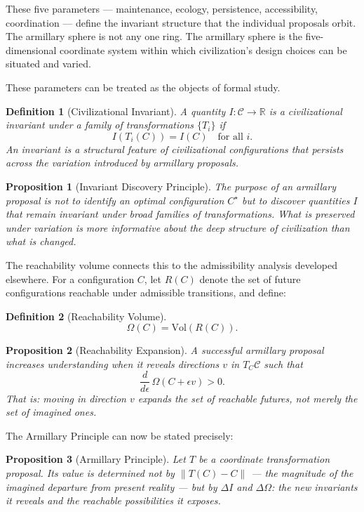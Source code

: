 \documentclass[12pt, a4paper]{article}
\theoremstyle{named}
\newtheorem{proposition}{Proposition}
\newtheorem{definition}{Definition}
\begin{document}
\medskip

These five parameters — maintenance, ecology, persistence,
accessibility, coordination — define the invariant structure that the
individual proposals orbit. The armillary sphere is not any one ring.
The armillary sphere is the five-dimensional coordinate system within
which civilization's design choices can be situated and varied.

These parameters can be treated as the objects of formal study.

\begin{definition}[Civilizational Invariant]
A quantity $I: \mathcal{C} \to \mathbb{R}$ is a \emph{civilizational
invariant} under a family of transformations $\{T_i\}$ if
\[
  I(T_i(C)) = I(C) \quad \text{for all } i.
\]
An invariant is a structural feature of civilizational configurations
that persists across the variation introduced by armillary proposals.
\end{definition}

\begin{proposition}[Invariant Discovery Principle]
The purpose of an armillary proposal is not to identify an optimal
configuration $C^\star$ but to discover quantities $I$ that remain
invariant under broad families of transformations. What is preserved
under variation is more informative about the deep structure of
civilization than what is changed.
\end{proposition}

The reachability volume connects this to the admissibility analysis
developed elsewhere. For a configuration $C$, let $R(C)$ denote the
set of future configurations reachable under admissible transitions,
and define:

\begin{definition}[Reachability Volume]
\[
  \Omega(C) = \mathrm{Vol}(R(C)).
\]
\end{definition}

\begin{proposition}[Reachability Expansion]
A successful armillary proposal increases understanding when it reveals
directions $v$ in $T_C\mathcal{C}$ such that
\[
  \frac{d}{d\epsilon}\,\Omega(C + \epsilon v) > 0.
\]
That is: moving in direction $v$ expands the set of reachable futures,
not merely the set of imagined ones.
\end{proposition}

The Armillary Principle can now be stated precisely:

\begin{proposition}[Armillary Principle]
Let $T$ be a coordinate transformation proposal. Its value is
determined not by $\|T(C) - C\|$ — the magnitude of the imagined
departure from present reality — but by $\Delta I$ and $\Delta\Omega$:
the new invariants it reveals and the reachable possibilities it
exposes.
\end{proposition}
\end{document}
